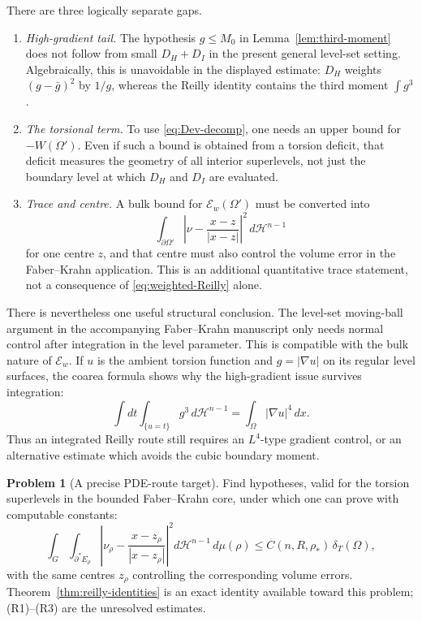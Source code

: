 \documentclass[11pt]{amsart}
\theoremstyle{definition}
\newtheorem{problem}[theorem]{Problem}
\newcommand{\Hn}{\mathcal H^{n-1}}
\newcommand{\Om}{\Omega}
\newcommand{\Dev}{\mathcal E}
\begin{document}
There are three logically separate gaps.

\begin{enumerate}[label=\textnormal{(R\arabic*)},leftmargin=2.8em]
\item \emph{High-gradient tail.}  The hypothesis \(g\le M_0\) in
Lemma~\ref{lem:third-moment} does not follow from small \(D_H+D_I\) in the
present general level-set setting.  Algebraically, this is unavoidable in
the displayed estimate: \(D_H\) weights \((g-\bar g)^2\) by \(1/g\), whereas
the Reilly identity contains the third moment \(\int g^3\).
\item \emph{The torsional term.}  To use \eqref{eq:Dev-decomp}, one needs an
upper bound for \(-W(\Om')\).  Even if such a bound is obtained from a
torsion deficit, that deficit measures the geometry of all interior
superlevels, not just the boundary level at which \(D_H\) and \(D_I\) are
evaluated.
\item \emph{Trace and centre.}  A bulk bound for \(\Dev_w(\Om')\) must be
converted into
\[
   \int_{\partial\Om'}
       \left|\nu-\frac{x-z}{|x-z|}\right|^2\,d\Hn
\]
for one centre \(z\), and that centre must also control the volume error in
the Faber--Krahn application.  This is an additional quantitative trace
statement, not a consequence of \eqref{eq:weighted-Reilly} alone.
\end{enumerate}

There is nevertheless one useful structural conclusion.  The level-set
moving-ball argument in the accompanying Faber--Krahn manuscript only needs
normal control after integration in the level parameter.  This is compatible
with the bulk nature of \(\Dev_w\).  If \(u\) is the ambient torsion function
and \(g=|\nabla u|\) on its regular level surfaces, the coarea formula shows
why the high-gradient issue survives integration:
\[
   \int dt\int_{\{u=t\}}g^3\,d\Hn
   =\int_{\Om}|\nabla u|^4\,dx.
\tag{5.23}\label{eq:coarea-fourth}
\]
Thus an integrated Reilly route still requires an \(L^4\)-type gradient
control, or an alternative estimate which avoids the cubic boundary moment.

\begin{problem}[A precise PDE-route target]\label{prob:pde-target}
Find hypotheses, valid for the torsion superlevels in the bounded
Faber--Krahn core, under which one can prove with computable constants:
\[
   \int_G\int_{\partial^*E_\rho}
      \left|\nu_\rho-\frac{x-z_\rho}{|x-z_\rho|}\right|^2
      d\Hn\,d\mu(\rho)
   \le C(n,R,\rho_*)\,\delta_T(\Om),
\tag{5.24}\label{eq:integrated-target}
\]
with the same centres \(z_\rho\) controlling the corresponding volume errors.
Theorem~\ref{thm:reilly-identities} is an exact identity available toward
this problem; (R1)--(R3) are the unresolved estimates.
\end{problem}
\end{document}
